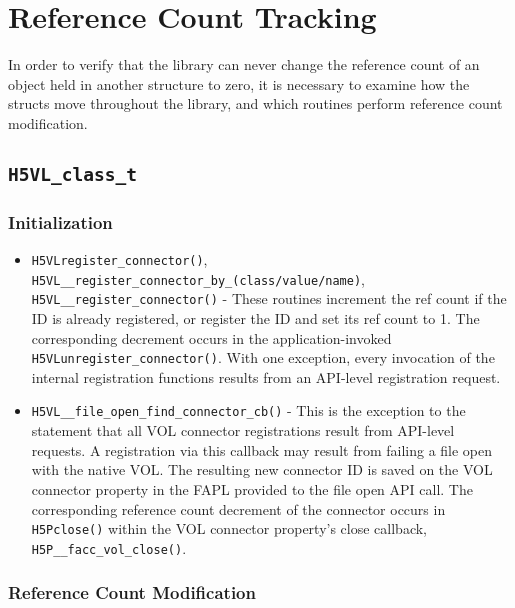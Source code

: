 \section{Reference Count Tracking}

In order to verify that the library can never change the reference count of an object held in another structure to zero, it is necessary to examine how the structs move throughout the library, and which routines perform reference count modification.

\subsection{\texttt{H5VL\_class\_t}}

\subsubsection{Initialization}

\begin{itemize}
    \item \texttt{H5VLregister\_connector()},  \texttt{H5VL\_\_register\_connector\_by\_(class/value/name)}, \\\texttt{H5VL\_\_register\_connector()} - These routines increment the ref count if the ID is already registered, or register the ID and set its ref count to 1. The corresponding decrement occurs in the application-invoked \texttt{H5VLunregister\_connector()}. With one exception, every invocation of the internal registration functions results from an API-level registration request.

    \item \texttt{H5VL\_\_file\_open\_find\_connector\_cb()} - This is the exception to the statement that all VOL connector registrations result from API-level requests. A registration via this callback may result from failing a file open with the native VOL. The resulting new connector ID is saved on the VOL connector property in the FAPL provided to the file open API call. The corresponding reference count decrement of the connector occurs in \texttt{H5Pclose()} within the VOL connector property's close callback, \texttt{H5P\_\_facc\_vol\_close()}.
    
\end{itemize}

\subsubsection{Reference Count Modification}

